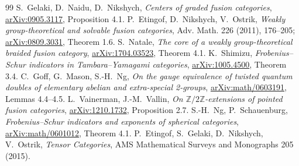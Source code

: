 \documentclass[11pt,a4paper]{article}
\theoremstyle{remark}\newtheorem{remark}[theorem]{Remark}
\begin{document}
\begin{thebibliography}{99}
 S.~Gelaki, D.~Naidu, D.~Nikshych, \emph{Centers of graded fusion categories}, \href{https://arxiv.org/abs/0905.3117}{arXiv:0905.3117}, Proposition 4.1.
 P.~Etingof, D.~Nikshych, V.~Ostrik, \emph{Weakly group-theoretical and solvable fusion categories}, Adv. Math. 226 (2011), 176--205; \href{https://arxiv.org/abs/0809.3031}{arXiv:0809.3031}, Theorem 1.6.
 S.~Natale, \emph{The core of a weakly group-theoretical braided fusion category}, \href{https://arxiv.org/abs/1704.03523}{arXiv:1704.03523}, Theorem 4.1.
 K.~Shimizu, \emph{Frobenius--Schur indicators in Tambara--Yamagami categories}, \href{https://arxiv.org/abs/1005.4500}{arXiv:1005.4500}, Theorem 3.4.
 C.~Goff, G.~Mason, S.-H.~Ng, \emph{On the gauge equivalence of twisted quantum doubles of elementary abelian and extra-special 2-groups}, \href{https://arxiv.org/abs/math/0603191}{arXiv:math/0603191}, Lemmas 4.4--4.5.
 L.~Vainerman, J.-M.~Vallin, \emph{On $\mathbb Z/2\mathbb Z$-extensions of pointed fusion categories}, \href{https://arxiv.org/abs/1210.1732}{arXiv:1210.1732}, Proposition 2.7.
 S.-H.~Ng, P.~Schauenburg, \emph{Frobenius--Schur indicators and exponents of spherical categories}, \href{https://arxiv.org/abs/math/0601012}{arXiv:math/0601012}, Theorem 4.1.
 P.~Etingof, S.~Gelaki, D.~Nikshych, V.~Ostrik, \emph{Tensor Categories}, AMS Mathematical Surveys and Monographs 205 (2015).
\end{thebibliography}
\end{document}
